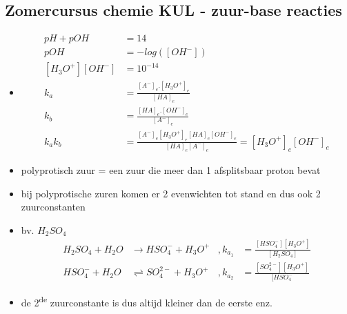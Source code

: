 \documentclass[10pt]{report}
\begin{document}
\subsection{Zomercursus chemie KUL - zuur-base reacties}
\begin{itemize}
    \item
        \begin{equation*}
            \begin{split}
                pH + pOH &= 14 \\
                pOH &= -log([OH^-]) \\
                [H_3O^+][OH^-] &= 10^{-14} \\
                k_a &= \frac{[A^-]_e.[H_3O^+]_e}{[HA]_e} \\
                k_b &= \frac{[HA]_e.[OH^-]_e}{[A^-]_e} \\
                k_ak_b &= \frac{[A^-]_e[H_3O^+]_e[HA]_e[OH^-]_e}{[HA]_e[A^-]_e} = [H_3O^+]_e[OH^-]_e
            \end{split}
        \end{equation*}
    \item polyprotisch zuur = een zuur die meer dan 1 afsplitsbaar proton bevat
    \item bij polyprotische zuren komen er 2 evenwichten tot stand en dus ook 2 zuurconstanten
    \item bv. $H_2SO_4$
        \begin{equation*}
            \begin{split}
                H_2SO_4 + H_2O &\rightarrow HSO_4^- + H_3O^+ &, k_{a_1} &= \frac{[HSO_4^-][H_3O^+]}{[H_2SO_4]} \\
                HSO_4^- + H_2O &\rightleftharpoons SO_4^{2-} + H_3O^+ &, k_{a_2} &= \frac{[SO_4^{2-}][H_3O^+]}{[HSO_4^-}
            \end{split}
        \end{equation*}
    \item de 2\textsuperscript{de} zuurconstante is dus altijd kleiner dan de eerste enz.
\end{itemize}
\end{document}
